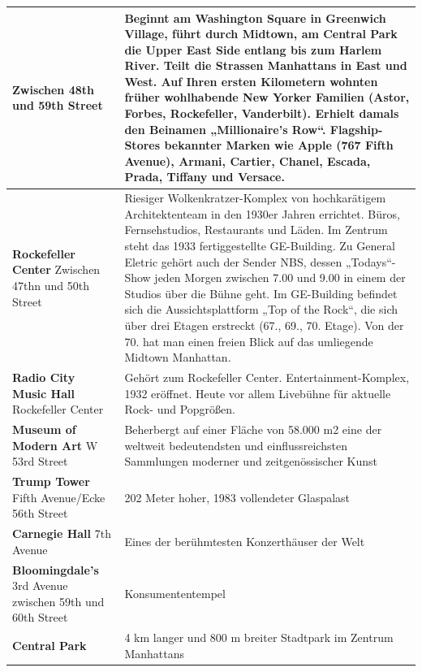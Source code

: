 \documentclass[fontsize=14pt,a4paper,headinclude,DIV=calc,automark]{scrbook}
\begin{document}
{\begin{longtable}{
    >{\raggedright\arraybackslash\columncolor{tablecellblue}}p{5.1cm}
    >{\raggedright\arraybackslash\columncolor{rightcolumn}}p{10cm}
    }
    Zwischen 48th und 59th Street & Beginnt am Washington Square in Greenwich Village, führt durch Midtown, am Central Park die Upper East Side entlang bis zum Harlem River. Teilt die Strassen Manhattans in East und West. Auf Ihren ersten Kilometern wohnten früher wohlhabende New Yorker Familien (Astor, Forbes, Rockefeller, Vanderbilt). Erhielt damals den Beinamen „Millionaire’s Row“. Flagship-Stores bekannter Marken wie Apple (767 Fifth Avenue), Armani, Cartier, Chanel, Escada, Prada, Tiffany und Versace. \\ \midrule
    \textbf{Rockefeller Center}\newline
    Zwischen 47thn und 50th Street & Riesiger Wolkenkratzer-Komplex von hochkarätigem Architektenteam in den 1930er Jahren errichtet. Büros, Fernsehstudios, Restaurants und Läden. Im Zentrum steht das 1933 fertiggestellte GE-Building. Zu General Eletric gehört auch der Sender NBS, dessen „Todays“-Show jeden Morgen zwischen 7.00 und 9.00 in einem der Studios über die Bühne geht. Im GE-Building befindet sich die Aussichtsplattform „Top of the Rock“, die sich über drei Etagen erstreckt (67., 69., 70. Etage). Von der 70. hat man einen freien Blick auf das umliegende Midtown Manhattan. \\ \midrule
    \textbf{Radio City Music Hall}\newline
    Rockefeller Center & Gehört zum Rockefeller Center. Entertainment-Komplex, 1932 eröffnet. Heute vor allem Livebühne für aktuelle Rock- und Popgrößen. \\ \midrule
    \textbf{Museum of Modern Art}\newline
    11 W 53rd Street & Beherbergt auf einer Fläche von 58.000 m2 eine der weltweit bedeutendsten und einflussreichsten Sammlungen moderner und zeitgenössischer Kunst \\ \midrule
    \textbf{Trump Tower}\newline
    Fifth Avenue/Ecke 56th Street & 202 Meter hoher, 1983 vollendeter Glaspalast \\ \midrule
    \textbf{Carnegie Hall}\newline
    881 7th Avenue & Eines der berühmtesten Konzerthäuser der Welt \\ \midrule
    \textbf{Bloomingdale’s}\newline
    3rd Avenue zwischen 59th und 60th Street & Konsumententempel \\ \midrule
    \textbf{Central Park}\newline
     & 4 km langer und 800 m breiter Stadtpark im Zentrum Manhattans \\ \midrule

\end{longtable}}
\end{document}
